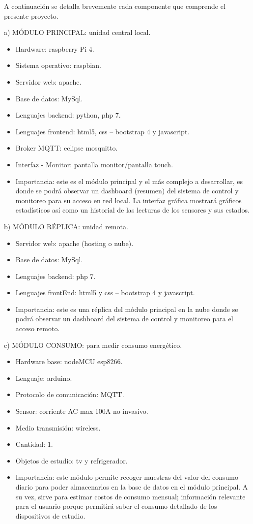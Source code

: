 \documentclass[11pt]{charter}
\begin{document}

A continuación se detalla brevemente cada componente que comprende el presente proyecto.

a) MÓDULO PRINCIPAL: unidad central local.
\begin{itemize}
\item Hardware: raspberry Pi 4.
\item Sistema operativo: raspbian.
\item Servidor web: apache.
\item Base de datos: MySql.
\item Lenguajes backend: python, php 7.
\item Lenguajes frontend: html5, css – bootstrap 4 y javascript.
\item Broker MQTT: eclipse mosquitto.
\item Interfaz - Monitor: pantalla monitor/pantalla touch.
\item Importancia: este es el módulo principal y el más complejo a desarrollar, es donde se podrá observar un dashboard (resumen) del sistema de control y monitoreo para su acceso en red local. La interfaz gráfica mostrará gráficos estadísticos así como un historial de las lecturas de los sensores y sus estados.
\end{itemize}

b) MÓDULO RÉPLICA: unidad remota.
\begin{itemize}
\item Servidor web: apache (hosting o nube).
\item Base de datos: MySql.
\item Lenguajes backend: php 7.
\item Lenguajes frontEnd: html5 y css – bootstrap 4 y javascript.
\item Importancia: este es una réplica del módulo principal en la nube donde se podrá observar un dashboard del sistema de control y monitoreo para el acceso remoto.
\end{itemize}


c) MÓDULO CONSUMO: para medir consumo energético.
\begin{itemize}
\item Hardware base: nodeMCU esp8266.
\item Lenguaje: arduino.
\item Protocolo de comunicación: MQTT.
\item Sensor: corriente AC max 100A no invasivo.
\item Medio transmisión: wireless.
\item Cantidad: 1.
\item Objetos de estudio: tv y refrigerador.
\item Importancia: este módulo permite recoger muestras del valor del consumo diario para poder almacenarlos en la base de datos en el módulo principal. A su vez, sirve para estimar costos de consumo mensual; información relevante para el usuario porque permitirá saber el consumo detallado de los dispositivos de estudio.
\end{itemize}
\end{document}
